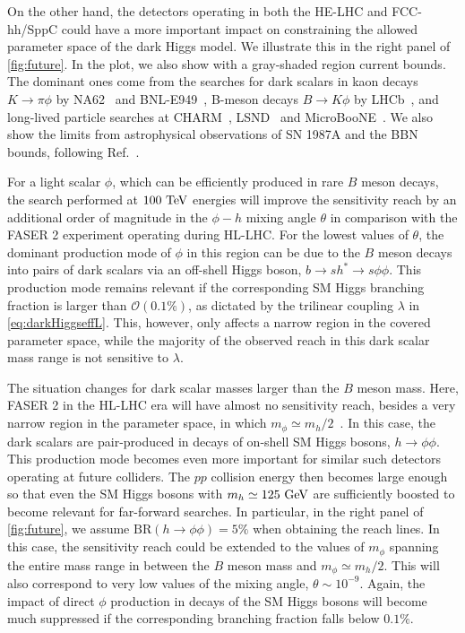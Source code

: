 \documentclass[prd,twocolumn,reprint,preprintnumbers,nofootinbib]{revtex4-1}
\begin{document}
On the other hand, the detectors operating in both the HE-LHC and FCC-hh/SppC could have a more important impact on constraining the allowed parameter space of the dark Higgs model. We illustrate this in the right panel of \cref{fig:future}. In the plot, we also show with a gray-shaded region current bounds. The dominant ones come from the searches for dark scalars in kaon decays $K \to \pi \phi$ by NA62~\cite{Ruggiero:2020phq} and BNL-E949~\cite{Artamonov:2009sz}, B-meson decays $B \to K \phi$ by LHCb~\cite{Aaij:2015tna, Aaij:2016qsm}, and long-lived particle searches at CHARM~\cite{Winkler:2018qyg}, LSND~\cite{Foroughi-Abari:2020gju} and MicroBooNE~\cite{microboone}. We also show the limits from astrophysical observations of SN 1987A and the BBN bounds, following Ref.~\cite{Winkler:2018qyg}. 

For a light scalar $\phi$, which can be efficiently produced in rare $B$ meson decays, the search performed at $100~\text{TeV}$ energies will improve the sensitivity reach by an additional order of magnitude in the $\phi-h$ mixing angle $\theta$ in comparison with the FASER 2 experiment operating during HL-LHC. For the lowest values of $\theta$, the dominant production mode of $\phi$ in this region can be due to the $B$ meson decays into pairs of dark scalars via an off-shell Higgs boson, $b\to s h^\ast\to s\phi\phi$. This production mode remains relevant if the corresponding SM Higgs branching fraction is larger than $\mathcal{O}(0.1\%)$, as dictated by the trilinear coupling $\lambda$ in \cref{eq:darkHiggseffL}. This, however, only affects a narrow region in the covered parameter space, while the majority of the observed reach in this dark scalar mass range is not sensitive to $\lambda$.

The situation changes for dark scalar masses larger than the $B$ meson mass. Here, FASER 2 in the HL-LHC era will have almost no sensitivity reach, besides a very narrow region in the parameter space, in which $m_\phi\simeq m_h/2$~\cite{Boiarska:2019vid}. In this case, the dark scalars are pair-produced in decays of on-shell SM Higgs bosons, $h\to\phi\phi$. This production mode becomes even more important for similar such detectors operating at future colliders. The $pp$ collision energy then becomes large enough so that even the SM Higgs bosons with $m_h\simeq 125~\text{GeV}$ are sufficiently boosted to become relevant for far-forward searches. In particular, in the right panel of \cref{fig:future}, we assume $\textrm{BR}(h\to\phi\phi) = 5\%$ when obtaining the reach lines. In this case, the sensitivity reach could be extended to the values of $m_\phi$ spanning the entire mass range in between the $B$ meson mass and $m_\phi \simeq m_h/2$. This will also correspond to very low values of the mixing angle, $\theta\sim 10^{-9}$. Again, the impact of direct $\phi$ production in decays of the SM Higgs bosons will become much suppressed if the corresponding branching fraction falls below $0.1\%$.
\end{document}

